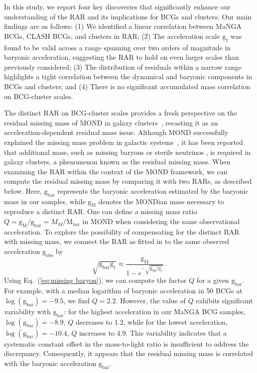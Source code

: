 \documentclass[a4paper, two-column, twocolappendix]{aa}
\newcommand{\Mbar}{\mathrm{M}_\mathrm{bar}}
\newcommand{\gbar}{\mathrm{g}_\mathrm{bar}}
\newcommand{\gobs}{\mathrm{g}_\mathrm{obs}}
\newcommand{\gdag}{\mathrm{g}_\mathrm{\dagger}}
\newcommand{\gddag}{\mathrm{g}_\mathrm{\ddagger}}
\newcommand{\gM}{\mathrm{g}_{\mathrm{M}}}
\begin{document}
In this study, we report four key discoveries that significantly enhance our understanding 
 of the RAR and its implications for BCGs and clusters. 
Our main findings are as follows:
(1) We identified a linear correlation between MaNGA BCGs, CLASH BCGs, and clusters in RAR; 
(2) The acceleration scale $\gddag$ was found to be valid across a range spanning over two orders of magnitude in baryonic acceleration, suggesting the RAR to hold on even larger scales than previously considered;
(3) The distribution of residuals within a narrow range highlights a tight correlation between the dynamical and baryonic components in BCGs and clusters; and
(4) There is no significant accumulated mass correlation on BCG-cluster scales.


The distinct RAR on BCG-cluster scales provides a fresh perspective 
 on the residual missing mass of MOND in galaxy clusters~\citep{Sanders99, Sanders03,  Angus08, Milgrom08, Angus10, FM12}, 
 recasting it as an acceleration-dependent residual mass issue. 
Although MOND successfully explained the missing mass problem in galactic systems~\citep{BZ22}, it has been reported that additional mass, such as missing baryons \citep{Sanders99, Sanders03, Milgrom08} or sterile neutrinos \citep{Angus10, FM12}, is required in galaxy clusters, a phenomenon known as the residual missing mass.
When examining the RAR within the context of the MOND framework, 
 we can compute the residual missing mass by comparing it with two RARs, as described below.
Here, $\gbar$ represents the baryonic acceleration estimated by the baryonic mass in our samples, 
 while $\gM$ denotes the MONDian mass necessary to reproduce a distinct RAR. 
One can define a missing mass ratio $Q=\gM/\gbar=M_{M}/\Mbar$ in MOND when considering the same observational acceleration. 
To explore the possibility of compensating for the distinct RAR with missing mass, we connect the RAR as fitted in \cite{McGaugh16} to the same observed acceleration $\gobs$ by
\begin{equation}\label{eq:missing baryon}
    \sqrt{\gbar\gddag} \approx \frac{\gM}{1 - e^{-\sqrt{\gM/\gdag}}}\,.
\end{equation}
Using Eq.~(\ref{eq:missing baryon}), we can compute the factor $Q$ for a given $\gbar$. For example, with a median logarithm of baryonic acceleration in 50 BCGs at $\log(\gbar) = -9.5$, we find $Q = 2.2$. However, the value of $Q$ exhibits significant variability with $\gbar$: for the highest acceleration in our MaNGA BCG samples, $\log(\gbar) = -8.9$, $Q$ decreases to $1.2$, while for the lowest acceleration, $\log(\gbar) = -10.4$, $Q$ increases to $4.9$. This variability indicates that a systematic constant offset in the mass-to-light ratio is insufficient to address the discrepancy. Consequently, it appears that the residual missing mass is correlated with the baryonic acceleration $\gbar$.
\end{document}
